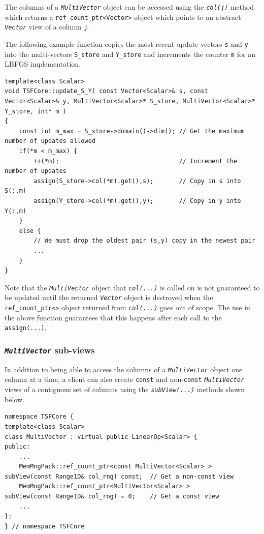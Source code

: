 \documentclass[10pt,fleqn]{article}
\begin{document}
The columns of a \texttt{\textit{MultiVector}} object can be accessed
using the \texttt{\textit{col(j)}} method which returns a
\texttt{ref\_count\_ptr<Vector>} object which points to an abstract
\texttt{\textit{Vector}} view of a column $j$.

The following example function copies the most recent update vectors
\texttt{s} and \texttt{y} into the multi-vectors \texttt{S\_store}
and \texttt{Y\_store} and increments the counter \texttt{m} for an
LBFGS implementation.

{\scriptsize\begin{verbatim}
template<class Scalar>
void TSFCore::update_S_Y( const Vector<Scalar>& s, const Vector<Scalar>& y, MultiVector<Scalar>* S_store, MultiVector<Scalar>* Y_store, int* m )
{
    const int m_max = S_store->domain()->dim(); // Get the maximum number of updates allowed
    if(*m < m_max) {
        ++(*m);                                 // Increment the number of updates
        assign(S_store->col(*m).get(),s);       // Copy in s into S(:,m)         
        assign(Y_store->col(*m).get(),y);       // Copy in y into Y(:,m)
    }
    else {
        // We must drop the oldest pair (s,y) copy in the newest pair
        ...
    }
}
\end{verbatim}}

Note that the \texttt{\textit{MultiVector}} object that
\texttt{\textit{col(...)}} is called on is not guaranteed to be
updated until the returned \texttt{\textit{Vector}} object is
destroyed when the \texttt{ref\_count\_ptr<>} object returned from
\texttt{\textit{col(...)}} goes out of scope.  The use in the above function
guarantees that this happens after each call to the
\texttt{assign(...)}.

%
\subsubsection{\texttt{\textit{MultiVector}} sub-views}
%

In addition to being able to access the columns of a
\texttt{\textit{MultiVector}} object one column at a time, a client
can also create \texttt{const} and non-\texttt{const}
\texttt{\textit{MultiVector}} views of a contiguous set of columns
using the \texttt{\textit{subView(...)}} methods shown below.

{\scriptsize\begin{verbatim}
namespace TSFCore {
template<class Scalar>
class MultiVector : virtual public LinearOp<Scalar> {
public:
    ...
    MemMngPack::ref_count_ptr<const MultiVector<Scalar> > subView(const Range1D& col_rng) const;  // Get a non-const view
    MemMngPack::ref_count_ptr<MultiVector<Scalar> >       subView(const Range1D& col_rng) = 0;    // Get a const view
    ...
};
} // namespace TSFCore
\end{verbatim}}
\end{document}

